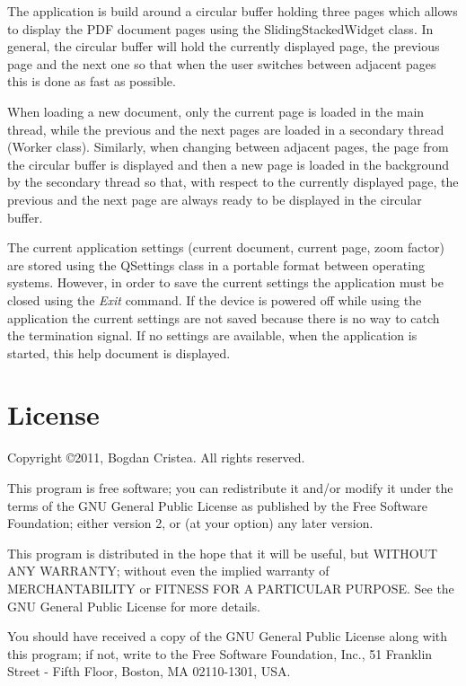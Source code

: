\documentclass[journal,12pt]{IEEEtran}
\begin{document}
The application is build around a circular buffer holding three pages which allows to display the PDF document pages using the \textrm{SlidingStackedWidget} class. In general, the circular buffer will hold the currently displayed page, the previous page and the next one so that when the user switches between adjacent pages this is done as fast as possible. 

When loading a new document, only the current page is loaded in the main thread, while the previous and the next pages are loaded in a secondary thread (\textrm{Worker} class). Similarly, when changing between adjacent pages, the page from the circular buffer is displayed and then a new page is loaded in the background by the secondary thread so that, with respect to the currently displayed page, the previous and the next page are always ready to be displayed in the circular buffer.

The current application settings (current document, current page, zoom factor) are stored using the \textrm{QSettings} class in a portable format between operating systems. However, in order to save the current settings the application must be closed using the \textit{Exit} command. If the device is powered off while using the application the current settings are not saved because there is no way to catch the termination signal. If no settings are available, when the application is started, this help document is displayed.

\section{License}
 Copyright \copyright 2011, Bogdan Cristea. All rights reserved.
 
 This program is free software; you can redistribute it and/or modify  it under the terms of the GNU General Public License as published by  the Free Software Foundation; either version 2, or (at your option)  any later version.
 
 This program is distributed in the hope that it will be useful,  but WITHOUT ANY WARRANTY; without even the implied warranty of
 MERCHANTABILITY or FITNESS FOR A PARTICULAR PURPOSE.  See the  GNU General Public License for more details.
 
 You should have received a copy of the GNU General Public License along with this program; if not, write to the Free Software
 Foundation, Inc., 51 Franklin Street - Fifth Floor, Boston, MA 02110-1301, USA.
\end{document}
